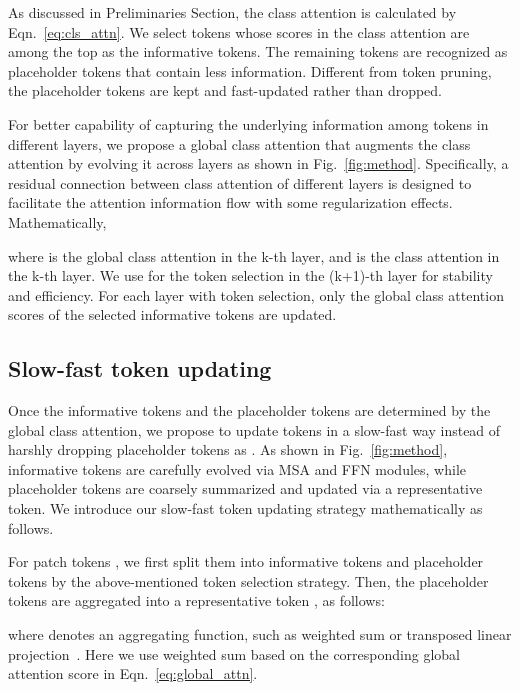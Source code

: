 \documentclass[letterpaper]{article} \usepackage{aaai22}  \usepackage{times}  \usepackage{helvet}  \usepackage{courier}  \usepackage[hyphens]{url}  \usepackage{graphicx} \urlstyle{rm} \def\UrlFont{\rm}  \usepackage{natbib}  \usepackage{caption} \DeclareCaptionStyle{ruled}{labelfont=normalfont,labelsep=colon,strut=off} \frenchspacing  \setlength{\pdfpagewidth}{8.5in}  \setlength{\pdfpageheight}{11in}  \usepackage{algorithm}
\begin{document}
As discussed in Preliminaries Section, the class attention   is calculated by Eqn.~\ref{eq:cls_attn}. We select  tokens whose scores in the class attention are among the top  as the informative tokens. The remaining  tokens are recognized as placeholder tokens that contain less information. Different from token pruning, the placeholder tokens are kept and fast-updated rather than dropped.

For better capability of capturing the underlying information among tokens in different layers, we propose a global class attention that augments the class attention by evolving it across layers as shown in Fig.~\ref{fig:method}. Specifically, a residual connection between class attention of different layers is designed to facilitate the attention information flow with some regularization effects. Mathematically, 

where  is the global class attention in the k-th layer, and  is the class attention in the k-th layer. We use  for the token selection in the (k+1)-th layer for stability and efficiency. For each layer with token selection, only the global class attention scores of the selected informative tokens are updated.



\subsection{Slow-fast token updating}
Once the informative tokens and the placeholder tokens are determined by the global class attention, we propose to update tokens in a slow-fast way instead of harshly dropping placeholder tokens as \cite{PatchSlimming,DynamicViT}. As shown in Fig.~\ref{fig:method}, informative tokens are carefully evolved via MSA and FFN modules, while placeholder tokens are coarsely summarized and updated via a representative token. 
We introduce our slow-fast token updating strategy mathematically as follows.




For  patch tokens , we first split them into  informative tokens  and  placeholder tokens  by the above-mentioned token selection strategy. Then, the placeholder tokens  are aggregated into  a representative token  , as follows:

where  denotes an aggregating function, such as weighted sum or transposed linear projection~\cite{mlp-mixer}. Here we use weighted sum based on the corresponding global attention score in Eqn.~\ref{eq:global_attn}.
\end{document}
